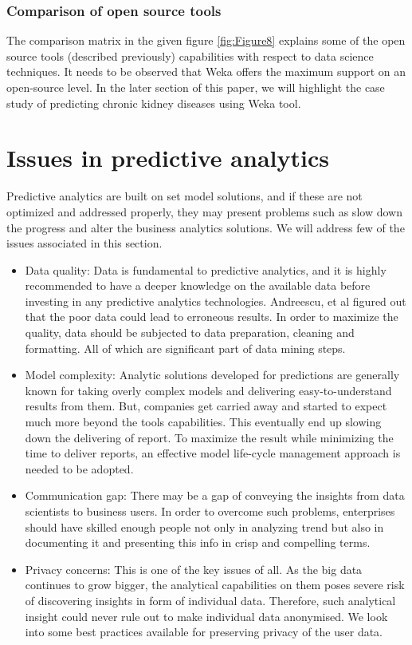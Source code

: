 \documentclass[runningheads]{llncs}
\begin{document}
\vspace{-1.5em}
\subsubsection{Comparison of open source tools}
The comparison matrix\cite{15} in the given figure \ref{fig:Figure8} explains some of the open source tools (described previously) capabilities with respect to data science techniques. It needs to be observed that Weka offers the maximum support on an open-source level. In the later section of this paper, we will highlight the case study of predicting chronic kidney diseases using Weka tool.

\section{Issues in predictive analytics}
Predictive analytics are built on set model solutions, and if these are not optimized and addressed properly, they may present problems such as slow down the progress and alter the business analytics solutions. We will address few of the issues associated in this section.
\begin{itemize}
	\item Data quality: Data is fundamental to predictive analytics, and it is highly recommended to have a deeper knowledge on the available data before investing in any predictive analytics technologies. Andreescu, et al figured out that the poor data could lead to erroneous results. In order to maximize the quality, data should be subjected to data preparation, cleaning and formatting. All of which are significant part of data mining steps.\\
	\item Model complexity: Analytic solutions developed for predictions are generally known for taking overly complex models and delivering easy-to-understand results from them. But, companies get carried away and started to expect much more beyond the tools capabilities. This eventually end up slowing down the delivering of report. To maximize the result while minimizing the time to deliver reports, an effective model life-cycle management approach is needed to be adopted.\\
	\item Communication gap: There may be a gap of conveying the insights from data scientists to business users. In order to overcome such problems, enterprises should have skilled enough people not only in analyzing trend but also in documenting it and presenting this info in crisp and compelling terms.\\
	\item Privacy concerns: This is one of the key issues of all. As the big data continues to grow bigger, the analytical capabilities on them poses severe risk of discovering insights in form of individual data. Therefore, such analytical insight could never rule out to make individual data anonymised. We look into some best practices available for preserving privacy of the user data. 
\end{itemize}
\end{document}
